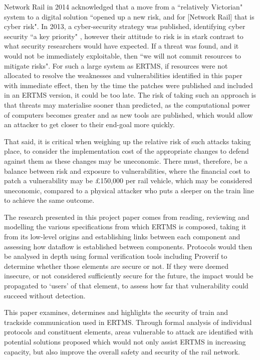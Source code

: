 \documentclass[twoside,11pt,a4paper]{article}
\begin{document}
Network Rail in 2014 \citep{Computerworld14} acknowledged that a move from a ``relatively Victorian" system to a digital solution ``opened up a new risk, and for [Network Rail] that is cyber risk". In 2013, a cyber-security strategy was published, identifying cyber security ``a key priority" \citep{NetworkRail13a}, however their attitude to risk is in stark contrast to what security researchers would have expected. If a threat was found, and it would not be immediately exploitable, then ``we will not commit resources to mitigate risks". For such a large system as ERTMS, if resources were not allocated to resolve the weaknesses and vulnerabilities identified in this paper with immediate effect, then by the time the patches were published and included in an ERTMS version, it could be too late. The risk of taking such an approach is that threats may materialise sooner than predicted, as the computational power of computers becomes greater and as new tools are published, which would allow an attacker to get closer to their end-goal more quickly.

That said, it is critical when weighing up the relative risk of such attacks taking place, to consider the implementation cost of the appropriate changes to defend against them as these changes may be uneconomic. There must, therefore, be a balance between risk and exposure to vulnerabilities, where the financial cost to patch a vulnerability may be \pounds150,000 per rail vehicle, which may be considered uneconomic, compared to a physical attacker who puts a sleeper on the train line to achieve the same outcome.

The research presented in this project paper comes from reading, reviewing and modelling the various specifications from which ERTMS is composed, taking it from its low-level origins and establishing links between each component and assessing how dataflow is established between components. Protocols would then be analysed in depth using formal verification tools including Proverif to determine whether those elements are secure or not. If they were deemed insecure, or not considered sufficiently secure for the future, the impact would be propagated to `users' of that element, to assess how far that vulnerability could succeed without detection.

This paper examines, determines and highlights the security of train and trackside communication used in ERTMS. Through formal analysis of individual protocols and constituent elements, areas vulnerable to attack are identified with potential solutions proposed which would not only assist ERTMS in increasing capacity, but also improve the overall safety and security of the rail network.\\\\\\
\end{document}
